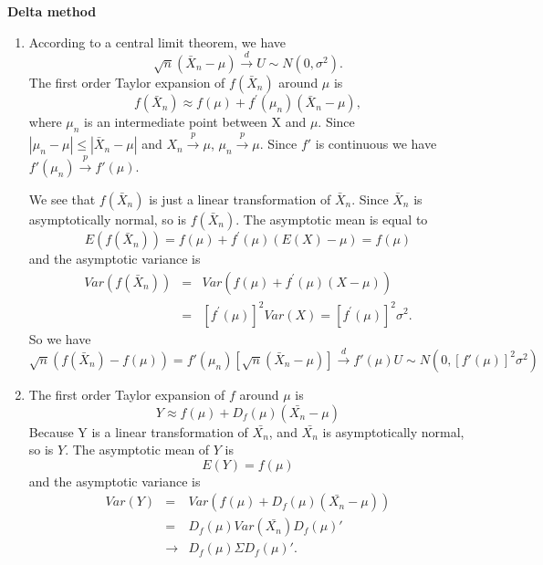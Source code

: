 \begin{Solution}{9.5}
\textbf{Delta method}

\begin{enumerate}
  \item According to a central limit theorem, we have
  $$\sqrt{n}\left(\bar{X}_n-\mu\right) \overset{d}{\rightarrow} U \sim N(0,\sigma^2).$$ The first order Taylor expansion of $f(\bar{X}_n)$ around $\mu $ is%
\begin{equation*}
f\left( \bar{X}_n \right) \approx f\left( \mu \right) +f^{\prime }\left( \mu_n  \right) \left(
\bar{X}_n-\mu \right),
\end{equation*}
where $\mu_n$ is an intermediate point between X and $\mu$. Since $|\mu_n-\mu|\leq |\bar{X}_n-\mu|$ and $X_n \overset{p}{\rightarrow} \mu$, $\mu_n \overset{p}{\rightarrow}\mu$. Since $f'$ is continuous we have $f'(\mu_n) \overset{p}{\rightarrow} f'(\mu)$.

We see that $f(\bar{X}_n)$ is just a linear transformation of $\bar{X}_n$. Since $\bar{X}_n$ is asymptotically normal, so is $f(\bar{X}_n)$. The asymptotic mean is equal to
\begin{equation*}
E\left( f(\bar{X}_n)\right) = f\left( \mu \right) +f^{\prime }\left( \mu
\right) \left( E\left(X\right)-\mu \right) = f\left( \mu \right)
\end{equation*}%
and the asymptotic variance is%
\begin{eqnarray*}
Var\left( f(\bar{X}_n)\right) &=&Var\left( f\left( \mu \right) +f^{\prime }\left(
\mu \right) \left( X-\mu \right) \right) \\
&=&\left[ f^{\prime }\left( \mu \right) \right] ^{2}Var\left( X\right)= \left[ f^{\prime }\left( \mu \right) \right] ^{2}\sigma ^{2}.
\end{eqnarray*}
So we have
$$\sqrt{n}\left(f(\bar{X}_n)-f(\mu)\right)=f'(\mu_n)\left[\sqrt{n}\left(\bar{X}_n-\mu\right)\right] \overset{d}{\rightarrow} f'(\mu)U \sim N(0,[f'(\mu)]^2\sigma^2)$$
\item The first order Taylor expansion of $f$ around $\mu $ is%
\begin{equation*}
Y \approx f\left( \mu \right) +D_f\left( \mu \right) \left(
\bar{X_n}-\mu \right)
\end{equation*}
Because Y is a linear transformation of $\bar{X_n}$, and $\bar{X_n}$ is asymptotically normal, so is $Y$. The asymptotic mean of $Y$ is%
\begin{equation*}
E\left( Y\right) = f\left( \mu \right)
\end{equation*}%
and the asymptotic variance is%
\begin{eqnarray*}
Var\left( Y\right) &=&Var\left( f\left( \mu \right) +D_f\left(\mu\right) \left( \bar{X_n}-\mu \right) \right) \\
&=&D_f\left( \mu \right) Var\left( \bar{X_n}\right)D_f\left( \mu \right)' \\
&\rightarrow & D_f\left( \mu \right)\Sigma D_f\left( \mu \right)'.
\end{eqnarray*}
\end{enumerate}

\end{Solution}
